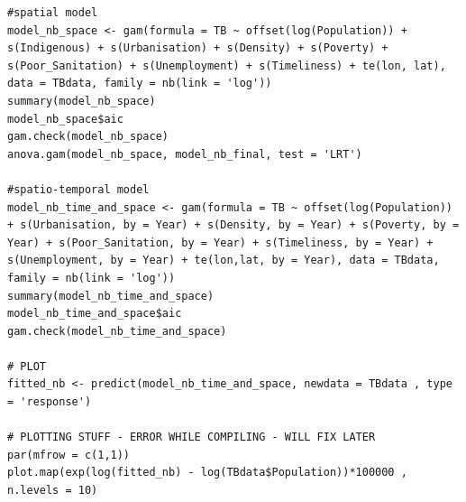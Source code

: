 \documentclass{article}
\begin{document}
\begin{verbatim}
#spatial model
model_nb_space <- gam(formula = TB ~ offset(log(Population)) + s(Indigenous) + s(Urbanisation) + s(Density) + s(Poverty) + s(Poor_Sanitation) + s(Unemployment) + s(Timeliness) + te(lon, lat), data = TBdata, family = nb(link = 'log'))
summary(model_nb_space)
model_nb_space$aic
gam.check(model_nb_space)
anova.gam(model_nb_space, model_nb_final, test = 'LRT')

#spatio-temporal model
model_nb_time_and_space <- gam(formula = TB ~ offset(log(Population)) + s(Urbanisation, by = Year) + s(Density, by = Year) + s(Poverty, by = Year) + s(Poor_Sanitation, by = Year) + s(Timeliness, by = Year) + s(Unemployment, by = Year) + te(lon,lat, by = Year), data = TBdata, family = nb(link = 'log'))
summary(model_nb_time_and_space)
model_nb_time_and_space$aic
gam.check(model_nb_time_and_space)

# PLOT
fitted_nb <- predict(model_nb_time_and_space, newdata = TBdata , type = 'response')

# PLOTTING STUFF - ERROR WHILE COMPILING - WILL FIX LATER
par(mfrow = c(1,1))
plot.map(exp(log(fitted_nb) - log(TBdata$Population))*100000 , n.levels = 10)
\end{verbatim}
\end{document}
